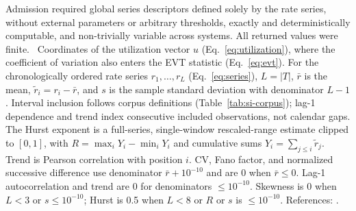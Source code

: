 \documentclass{article}
\begin{document}
\begin{table}[H]
\begin{minipage}{\linewidth}
Admission required global series descriptors defined solely by the rate series, without external parameters or arbitrary thresholds, exactly and deterministically computable, and non-trivially variable across systems. All returned values were finite. \ddag~Coordinates of the utilization vector $u$ (Eq.~\eqref{eq:utilization}), where the coefficient of variation also enters the EVT statistic (Eq.~\eqref{eq:evt}). For the chronologically ordered rate series $r_1, \ldots, r_L$ (Eq.~\eqref{eq:series}), $L = \lvert T \rvert$, $\bar{r}$ is the mean, $\tilde{r}_i = r_i - \bar{r}$, and $s$ is the sample standard deviation with denominator $L - 1$. Interval inclusion follows corpus definitions (Table~\ref{tab:si-corpus}); lag-1 dependence and trend index consecutive included observations, not calendar gaps. The Hurst exponent is a full-series, single-window rescaled-range estimate clipped to $[0, 1]$, with $R = \max_i Y_i - \min_i Y_i$ and cumulative sums $Y_i = \sum_{j \le i} \tilde{r}_j$. Trend is Pearson correlation with position $i$. CV, Fano factor, and normalized successive difference use denominator $\bar{r} + 10^{-10}$ and are 0 when $\bar{r} \le 0$. Lag-1 autocorrelation and trend are 0 for denominators $\le 10^{-10}$. Skewness is 0 when $L < 3$ or $s \le 10^{-10}$; Hurst is 0.5 when $L < 8$ or $R$ or $s$ is $\le 10^{-10}$. References: \citep{ref53,ref54,ref55,ref65,ref66,ref108,ref109,ref110,ref113}.
\end{minipage}
\end{table}
\end{document}
